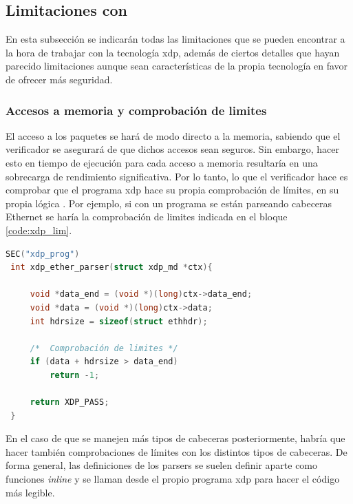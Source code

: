 \subsection{Limitaciones con }

En esta subsección se indicarán todas las limitaciones que se pueden encontrar a la hora de trabajar con la tecnología \gls{xdp}, además de ciertos detalles que hayan parecido limitaciones aunque sean características de la propia tecnología en favor de ofrecer más seguridad.

\subsubsection{Accesos a memoria y comprobación de limites}

El acceso a los paquetes se hará de modo directo a la memoria, sabiendo que el verificador se asegurará de que dichos accesos sean seguros. Sin embargo, hacer esto en tiempo de ejecución para cada acceso a memoria resultaría en una sobrecarga de rendimiento significativa. Por lo tanto, lo que el verificador hace es comprobar que el programa \gls{xdp} hace su propia comprobación de límites, en su propia lógica \cite{xdp1}. Por ejemplo, si con un programa se están parseando cabeceras Ethernet se haría la comprobación de limites indicada en el bloque \ref{code:xdp_lim}.
\begin{lstlisting}[language=C, style=C-color, caption={Comprobación de limites en XDP},label=code:xdp_lim]
 SEC("xdp_prog")
 int xdp_ether_parser(struct xdp_md *ctx){
 
	 void *data_end = (void *)(long)ctx->data_end;
	 void *data = (void *)(long)ctx->data;
     int hdrsize = sizeof(struct ethhdr);
    
     /*  Comprobación de limites */
     if (data + hdrsize > data_end)
		 return -1;
		
	 return XDP_PASS;
 }
\end{lstlisting}
\vspace{0.2cm}

En el caso de que se manejen más tipos de cabeceras posteriormente, habría que hacer también comprobaciones de límites con los distintos tipos de cabeceras. De forma general, las definiciones de los parsers se suelen definir aparte como funciones \textit{inline} y  se llaman desde el propio programa \gls{xdp} para hacer el código más legible. \\
\par

